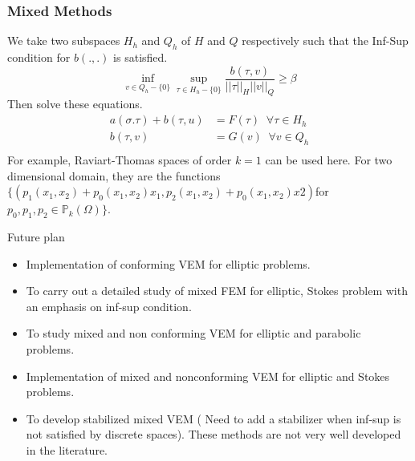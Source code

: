 \documentclass{beamer}
\begin{document}
\frame
{
	\frametitle{Mixed Methods}
We take two subspaces $H_h$ and $Q_h$ of $H$ and $Q$ respectively such that the Inf-Sup condition for $b(.,.)$ is satisfied.
\begin{equation*}
\inf\limits_{v\in Q_h-\{0\}} \sup\limits_{\tau\in H_h-\{0\}} \frac{b(\tau,v)}{||\tau||_H||v||_Q} \ge \beta
\end{equation*}
Then solve these equations.
\begin{equation*}
\begin{split}
a(\sigma . \tau)+b(\tau , u) & = F(\tau) \;\; \forall \tau \in H_h \\
b(\tau,v) & =G(v) \;\; \forall v \in Q_h \\
\end{split}
\end{equation*}
For example, Raviart-Thomas spaces of order $k=1$ can be used here. For two dimensional domain, they are the functions $\{(p_1(x_1,x_2)+p_0(x_1,x_2)x_1,p_2(x_1,x_2)+p_0(x_1,x_2)x2)$\linebreak for $p_0,p_1,p_2\in \mathbb{P}_k(\Omega)\}$.
}

\frame
{
	{Future plan}
\begin{itemize}
\item Implementation of conforming VEM for elliptic problems.
\item To carry out a detailed study of  mixed FEM for elliptic, Stokes problem with an emphasis on inf-sup condition.
\item To study mixed and non conforming VEM for elliptic and parabolic problems.
\item Implementation of mixed and nonconforming VEM for elliptic and Stokes problems.
\item  To develop stabilized mixed  VEM ( Need to add a stabilizer when inf-sup is not satisfied by discrete spaces). These methods are not very well developed in the literature.   
\end{itemize}
}


\end{document}
